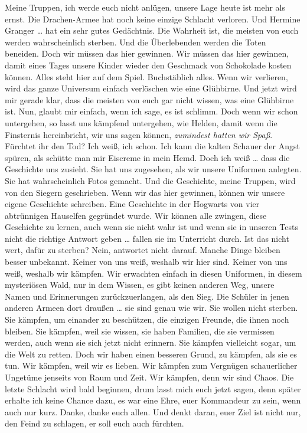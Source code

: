 Meine Truppen, ich werde euch nicht anlügen, unsere Lage heute ist mehr als ernst. Die Drachen-Armee hat noch keine einzige Schlacht verloren. Und Hermine Granger … hat ein sehr gutes Gedächtnis. Die Wahrheit ist, die meisten von euch werden wahrscheinlich sterben. Und die Überlebenden werden die Toten beneiden. Doch wir müssen das hier gewinnen. Wir müssen das hier gewinnen, damit eines Tages unsere Kinder wieder den Geschmack von Schokolade kosten können. Alles steht hier auf dem Spiel. Buchstäblich alles. Wenn wir verlieren, wird das ganze Universum einfach verlöschen wie eine Glühbirne. Und jetzt wird mir gerade klar, dass die meisten von euch gar nicht wissen, was eine Glühbirne ist. Nun, glaubt mir einfach, wenn ich sage, es ist schlimm. Doch wenn wir schon untergehen, so lasst uns kämpfend untergehen, wie Helden, damit wenn die Finsternis hereinbricht, wir uns sagen können, \emph{zumindest hatten wir Spaß}. Fürchtet ihr den Tod? Ich weiß, ich schon. Ich kann die kalten Schauer der Angst spüren, als schütte man mir Eiscreme in mein Hemd. Doch ich weiß … dass die Geschichte uns zusieht. Sie hat uns zugesehen, als wir unsere Uniformen anlegten. Sie hat wahrscheinlich Fotos gemacht. Und die Geschichte, meine Truppen, wird von den Siegern geschrieben. Wenn wir das hier gewinnen, können wir unsere eigene Geschichte schreiben. Eine Geschichte in der Hogwarts von vier abtrünnigen Hauselfen gegründet wurde. Wir können alle zwingen, diese Geschichte zu lernen, auch wenn sie nicht wahr ist und wenn sie in unseren Tests nicht die richtige Antwort geben … fallen sie im Unterricht durch. Ist das nicht wert, dafür zu sterben? Nein, antwortet nicht darauf. Manche Dinge bleiben besser unbekannt. Keiner von uns weiß, weshalb wir hier sind. Keiner von uns weiß, weshalb wir kämpfen. Wir erwachten einfach in diesen Uniformen, in diesem mysteriösen Wald, nur in dem Wissen, es gibt keinen anderen Weg, unsere Namen und Erinnerungen zurückzuerlangen, als den Sieg. Die Schüler in jenen anderen Armeen dort draußen … sie sind genau wie wir. Sie wollen nicht sterben. Sie kämpfen, um einander zu beschützen, die einzigen Freunde, die ihnen noch bleiben. Sie kämpfen, weil sie wissen, sie haben Familien, die sie vermissen werden, auch wenn sie sich jetzt nicht erinnern. Sie kämpfen vielleicht sogar, um die Welt zu retten. Doch wir haben einen besseren Grund, zu kämpfen, als sie es tun. Wir kämpfen, weil wir es lieben. Wir kämpfen zum Vergnügen schauerlicher Ungetüme jenseits von Raum und Zeit. Wir kämpfen, denn wir sind Chaos. Die letzte Schlacht wird bald beginnen, drum lasst mich euch jetzt sagen, denn später erhalte ich keine Chance dazu, es war eine Ehre, euer Kommandeur zu sein, wenn auch nur kurz. Danke, danke euch allen. Und denkt daran, euer Ziel ist nicht nur, den Feind zu schlagen, er soll euch auch fürchten.

